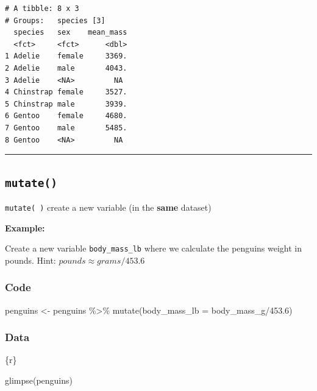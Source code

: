 \documentclass[
  letterpaper,
  DIV=11,
  numbers=noendperiod]{scrreprt}
\newenvironment{Shaded}{\begin{snugshade}}{\end{snugshade}}
\newcommand{\AttributeTok}[1]{\textcolor[rgb]{0.40,0.45,0.13}{#1}}
\newcommand{\FloatTok}[1]{\textcolor[rgb]{0.68,0.00,0.00}{#1}}
\newcommand{\FunctionTok}[1]{\textcolor[rgb]{0.28,0.35,0.67}{#1}}
\newcommand{\InformationTok}[1]{\textcolor[rgb]{0.37,0.37,0.37}{#1}}
\newcommand{\NormalTok}[1]{\textcolor[rgb]{0.00,0.23,0.31}{#1}}
\newcommand{\OtherTok}[1]{\textcolor[rgb]{0.00,0.23,0.31}{#1}}
\newcommand{\SpecialCharTok}[1]{\textcolor[rgb]{0.37,0.37,0.37}{#1}}
\begin{document}
\begin{verbatim}
# A tibble: 8 x 3
# Groups:   species [3]
  species   sex    mean_mass
  <fct>     <fct>      <dbl>
1 Adelie    female     3369.
2 Adelie    male       4043.
3 Adelie    <NA>         NA 
4 Chinstrap female     3527.
5 Chinstrap male       3939.
6 Gentoo    female     4680.
7 Gentoo    male       5485.
8 Gentoo    <NA>         NA 
\end{verbatim}

\begin{center}\rule{0.5\linewidth}{0.5pt}\end{center}

\hypertarget{mutate}{%
\subsection*{\texorpdfstring{\texttt{mutate()}}{mutate()}}\label{mutate}}

\texttt{mutate(\ )} create a new variable (in the \textbf{same} dataset)

\textbf{Example:}

Create a new variable \texttt{body\_mass\_lb} where we calculate the
penguins weight in pounds. Hint: \(pounds \approx grams/453.6\)

\hypertarget{code-7}{%
\subsubsection*{Code}\label{code-7}}

\begin{Shaded}
\begin{Highlighting}[]
\NormalTok{penguins }\OtherTok{\textless{}{-}}\NormalTok{ penguins }\SpecialCharTok{\%\textgreater{}\%}
  \FunctionTok{mutate}\NormalTok{(}\AttributeTok{body\_mass\_lb =}\NormalTok{ body\_mass\_g}\SpecialCharTok{/}\FloatTok{453.6}\NormalTok{)}
\end{Highlighting}
\end{Shaded}

\hypertarget{data-6}{%
\subsubsection*{Data}\label{data-6}}

\begin{Shaded}
\begin{Highlighting}[]
\InformationTok{\textasciigrave{}\textasciigrave{}\textasciigrave{}\{r\}}

\FunctionTok{glimpse}\NormalTok{(penguins)}
\InformationTok{\textasciigrave{}\textasciigrave{}\textasciigrave{}}
\end{Highlighting}
\end{Shaded}
\end{document}
